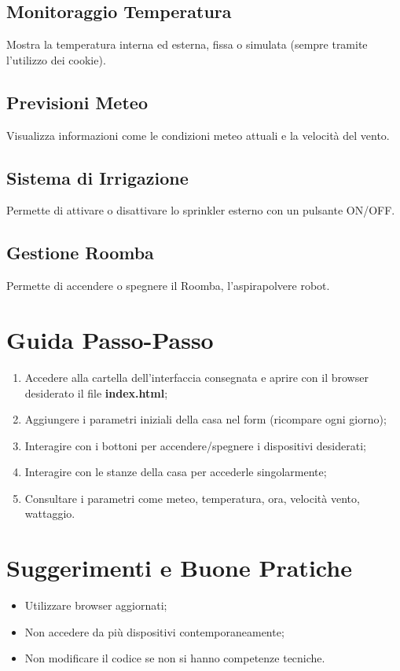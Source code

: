 \documentclass[a4paper,12pt]{article}
\begin{document}
\subsection*{Monitoraggio Temperatura}
Mostra la temperatura interna ed esterna, fissa o simulata (sempre tramite l'utilizzo dei cookie).

\subsection*{Previsioni Meteo}
Visualizza informazioni come le condizioni meteo attuali e la velocità del vento.

\subsection*{Sistema di Irrigazione}
Permette di attivare o disattivare lo sprinkler esterno con un pulsante ON/OFF.

\subsection*{Gestione Roomba}
Permette di accendere o spegnere il Roomba, l'aspirapolvere robot.

\section{Guida Passo-Passo}

\begin{enumerate}
  \item Accedere alla cartella dell'interfaccia consegnata e aprire con il browser desiderato il file \textbf{index.html};
  \item Aggiungere i parametri iniziali della casa nel form (ricompare ogni giorno);
  \item Interagire con i bottoni per accendere/spegnere i dispositivi desiderati;
  \item Interagire con le stanze della casa per accederle singolarmente;
  \item Consultare i parametri come meteo, temperatura, ora, velocità vento, wattaggio.
\end{enumerate}

\section{Suggerimenti e Buone Pratiche}

\begin{itemize}
  \item Utilizzare browser aggiornati;
  \item Non accedere da più dispositivi contemporaneamente;
  \item Non modificare il codice se non si hanno competenze tecniche.
\end{itemize}
\end{document}
